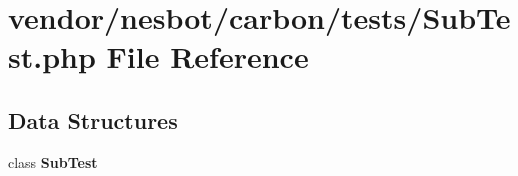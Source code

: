 \section{vendor/nesbot/carbon/tests/\+Sub\+Test.php File Reference}
\label{_sub_test_8php}
\subsection*{Data Structures}
\begin{DoxyCompactItemize}
\item 
class {\bf Sub\+Test}
\end{DoxyCompactItemize}
